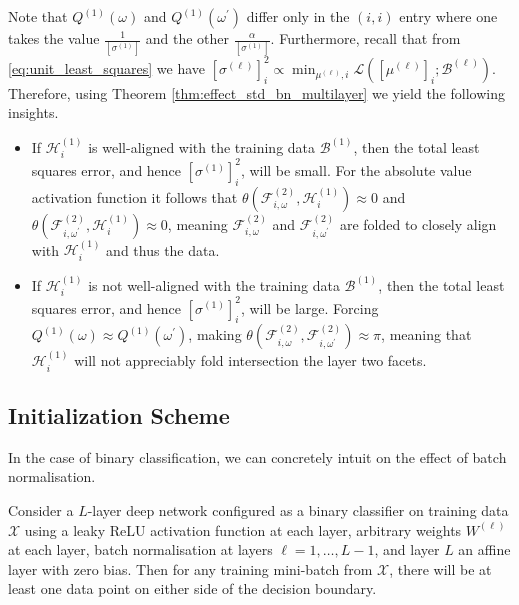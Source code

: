 \begin{remark}
    Note that $Q^{(1)}(\omega)$ and $Q^{(1)}\left(\omega^\prime\right)$ differ only in the $(i,i)$ entry where one takes the value $\frac{1}{\left[\sigma^{(1)}\right]}$ and the other $\frac{\alpha}{\left[\sigma^{(1)}\right]}$. Furthermore, recall that from \eqref{eq:unit_least_squares} we have $\left[\sigma^{(\ell)}\right]_i^2\propto\min_{\mu^{(\ell)},i}\mathcal{L}\left(\left[\mu^{(\ell)}\right]_i;\mathcal{B}^{(\ell)}\right)$. Therefore, using Theorem \ref{thm:effect_std_bn_multilayer} we yield the following insights.
    \begin{itemize}
        \item If $\mathcal{H}^{(1)}_i$ is well-aligned with the training data $\mathcal{B}^{(1)}$, then the total least squares error, and hence $\left[\sigma^{(1)}\right]_i^2$, will be small. For the absolute value activation function it follows that $\theta\left(\mathcal{F}^{(2)}_{i,\omega},\mathcal{H}^{(1)}_i\right)\approx0$ and $\theta\left(\mathcal{F}^{(2)}_{i,\omega^\prime},\mathcal{H}^{(1)}_i\right)\approx0$, meaning $\mathcal{F}^{(2)}_{i,\omega}$ and $\mathcal{F}^{(2)}_{i,\omega^\prime}$ are folded to closely align with $\mathcal{H}^{(1)}_i$ and thus the data.
        \item If $\mathcal{H}^{(1)}_i$ is not well-aligned with the training data $\mathcal{B}^{(1)}$, then the total least squares error, and hence $\left[\sigma^{(1)}\right]_i^2$, will be large. Forcing $Q^{(1)}(\omega)\approx Q^{(1)}\left(\omega^\prime\right)$, making $\theta\left(\mathcal{F}^{(2)}_{i,\omega},\mathcal{F}^{(2)}_{i,\omega^\prime}\right)\approx\pi$, meaning that $\mathcal{H}^{(1)}_i$ will not appreciably fold intersection the layer two facets.
    \end{itemize}
\end{remark}

\subsection{Initialization Scheme}

In the case of binary classification, we can concretely intuit on the effect of batch normalisation.

\begin{proposition}\label{prop:initialisation_bn_binary_classification}
    Consider a $L$-layer deep network configured as a binary classifier on training data $\mathcal{X}$ using a leaky ReLU activation function at each layer, arbitrary weights $W^{(\ell)}$ at each layer, batch normalisation at layers $\ell=1,\dots,L-1$, and layer $L$ an affine layer with zero bias. Then for any training mini-batch from $\mathcal{X}$, there will be at least one data point on either side of the decision boundary.
\end{proposition}

